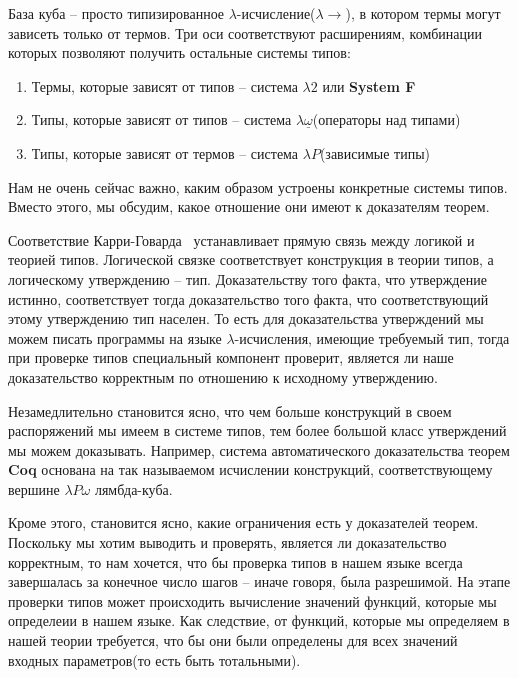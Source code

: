 
База куба -- просто типизированное $\lambda$-исчисление($\lambda{\to}$), в котором термы могут зависеть только от термов. Три оси соответствуют расширениям, комбинации которых позволяют получить остальные системы типов:

\begin{enumerate}
  \item Термы, которые зависят от типов -- система $\lambda2$ или \textbf{System F}
  \item Типы, которые зависят от типов -- система $\lambda \underline{\omega}$(операторы над типами)
  \item Типы, которые зависят от термов -- система $\lambda P$(зависимые типы)
\end{enumerate}

Нам не очень сейчас важно, каким образом устроены конкретные системы типов. Вместо этого, мы обсудим, какое отношение они имеют к доказателям теорем.

Соответствие Карри-Говарда~\cite{howard1980formulae} устанавливает прямую связь между логикой и теорией типов. Логической связке соответствует конструкция в теории типов, а логическому утверждению -- тип. Доказательству того факта, что утверждение истинно, соответствует тогда доказательство того факта, что соответствующий этому утверждению тип населен. То есть для доказательства утверждений мы можем писать программы на языке $\lambda$-исчисления, имеющие требуемый тип, тогда при проверке типов специальный компонент проверит, является ли наше доказательство корректным по отношению к исходному утверждению.

Незамедлительно становится ясно, что чем больше конструкций в своем распоряжений мы имеем в системе типов, тем более большой класс утверждений мы можем доказывать. Например, система автоматического доказательства теорем \textbf{Coq} основана на так называемом исчислении конструкций, соответствующему вершине $\lambda{}P{}\omega$ лямбда-куба.

Кроме этого, становится ясно, какие ограничения есть у доказателей теорем. Поскольку мы хотим выводить и проверять, является ли доказательство корректным, то нам хочется, что бы проверка типов в нашем языке всегда завершалась за конечное число шагов -- иначе говоря, была разрешимой. На этапе проверки типов может происходить вычисление значений функций, которые мы определеии в нашем языке. Как следствие, от функций, которые мы определяем в нашей теории требуется, что бы они были определены для всех значений входных параметров(то есть быть тотальными).
